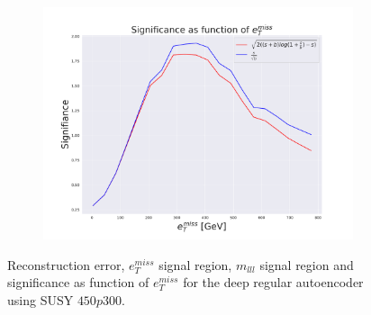 \begin{figure}[H]
    \begin{subfigure}{.60\textwidth}
        \includegraphics[width=\textwidth]{Figures/AE_testing/big/2lep/significance_etmiss_450p0p0300_-1.4360553938127363.pdf}
        \caption{}
        \label{fig:AE_2lep_big_signi_450}
    \end{subfigure}
    \hfill      
    \caption[2lep deep network | $450p300$ | AE]{Reconstruction error, $e_T^{miss}$ signal region, $m_{lll}$ signal region and significance as function of 
    $e_T^{miss}$ for the deep regular autoencoder using SUSY $450p300$.}
    \label{fig:AE_2lep_big_rec_sig_signi_450}
\end{figure}

